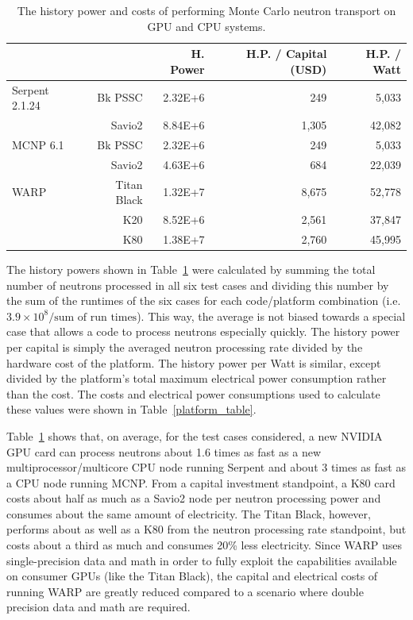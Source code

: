 \documentclass[preprint,12pt]{elsarticle}
\begin{document}
\begin{table}[h]
\centering
\caption{The history power and costs of performing Monte Carlo neutron transport on GPU and CPU systems.}
\label{history_power}
\small
\begin{tabular}{| l r | r | r | r |}
\cline{3-5}
\multicolumn{2}{c|}{}             & H. Power   & H.P. / Capital (USD)   & H.P. / Watt  \\
\hline                            
Serpent 2.1.24   &   Bk PSSC      & 2.32E+6    &   249           &  5,033        \\
                 &   Savio2       & 8.84E+6    & 1,305           & 42,082        \\
\hline                                 
MCNP 6.1         &   Bk PSSC      & 2.32E+6    &   249           &  5,033        \\
                 &   Savio2       & 4.63E+6    &   684           & 22,039        \\
\hline                            
WARP             &   Titan Black  & 1.32E+7    & 8,675           & 52,778        \\
                 &   K20          & 8.52E+6    & 2,561           & 37,847        \\
                 &   K80          & 1.38E+7    & 2,760           & 45,995        \\
\hline
\end{tabular}
\end{table}

The history powers shown in Table~\ref{history_power} were calculated by summing the total number of neutrons processed in all six test cases and dividing this number by the sum of the runtimes of the six cases for each code/platform combination (i.e.\ $3.9\times10^8 / \textrm{sum of run times}$).  This way, the average is not biased towards a special case that allows a code to process neutrons especially quickly.  The history power per capital is simply the averaged neutron processing rate divided by the hardware cost of the platform.  The history power per Watt is similar, except divided by the platform's total maximum electrical power consumption rather than the cost.  The costs and electrical power consumptions used to calculate these values were shown in Table~\ref{platform_table}.


Table~\ref{history_power} shows that, on average, for the test cases considered, a new NVIDIA GPU card can process neutrons about 1.6 times as fast as a new multiprocessor/multicore CPU node running Serpent and about 3 times as fast as a CPU node running MCNP.  From a capital investment standpoint, a K80 card costs about half as much as a Savio2 node per neutron processing power and consumes about the same amount of electricity.  The Titan Black, however, performs about as well as a K80 from the neutron processing rate standpoint, but costs about a third as much and consumes 20\% less electricity.  Since WARP uses single-precision data and math in order to fully exploit the capabilities available on consumer GPUs (like the Titan Black), the capital and electrical costs of running WARP are greatly reduced compared to a scenario where double precision data and math are required. 
\end{document}
